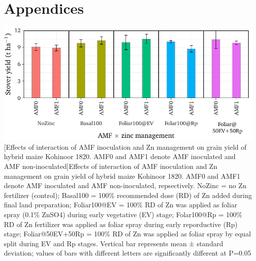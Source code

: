 \documentclass[12pt, oneside]{book}
\begin{document}
\chapter*{Appendices}
\appendix





\newpage


\includegraphics[width=\textwidth]{figures/figA2.pdf}
[Effects of interaction of AMF inoculation and Zn management on grain yield of hybrid maize Kohinoor 1820. AMF0 and AMF1 denote AMF inoculated and AMF non-inoculated]{Effects of interaction of AMF inoculation and Zn management on grain yield of hybrid maize Kohinoor 1820. AMF0 and AMF1 denote AMF inoculated and AMF non-inoculated, repsectively. NoZinc = no Zn fertilizer (control); Basal100 = 100\% recommended dose (RD) of Zn added during final land preparation; Foliar100@EV = 100\% RD of Zn was applied as foliar spray (0.1\% ZnSO4) during early vegetative (EV) stage; Folar100@Rp = 100\% RD of Zn fertilizer was applied as foliar spray during early reporductive (Rp) stage; Foliar@50EV+50Rp = 100\% RD of Zn was applied as foliar spray by equal split during EV and Rp stages. Vertical bar represents mean ± standard deviation; values of bars with different letters are significantly different at P=0.05} %
\label{figA2}





\end{document}
